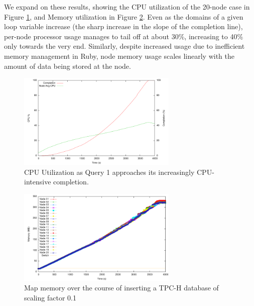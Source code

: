 We expand on these results, showing the CPU utilization of the 20-node case in Figure \ref{fig:20nodes100mbUpdatesVsCPUCompletion}, and Memory utilization in Figure \ref{fig:20nodes100mbUpdatesVsMemory}.  Even as the domains of a given loop variable increase (the sharp increase in the slope of the completion line), per-node processor usage manages to tail off at about 30\%, increasing to 40\% only towards the very end.  Similarly, despite increased usage due to inefficient memory management in Ruby, node memory usage scales linearly with the amount of data being stored at the node.

\begin{figure}
\begin{center}
\includegraphics[width=3.0in]{images/20nodes100mbUpdatesVsCPUCompletion.pdf}
\caption{CPU Utilization as Query 1 approaches its increasingly CPU-intensive completion.}
\label{fig:20nodes100mbUpdatesVsCPUCompletion}
\end{center}
\end{figure}
\begin{figure}
\begin{center}
\includegraphics[width=3.0in]{images/20nodes100mbUpdatesVsMemory.pdf}
\caption{Map memory over the course of inserting a TPC-H database of scaling factor 0.1}
\label{fig:20nodes100mbUpdatesVsMemory}
\end{center}
\end{figure}

